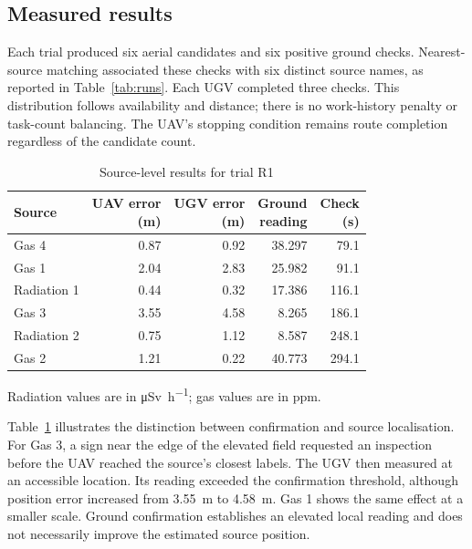 \documentclass[conference]{IEEEtran}
\begin{document}
\subsection{Measured results}
Each trial produced six aerial candidates and six positive ground checks. Nearest-source matching associated these checks with six distinct source names, as reported in Table~\ref{tab:runs}. Each UGV completed three checks. This distribution follows availability and distance; there is no work-history penalty or task-count balancing. The UAV's stopping condition remains route completion regardless of the candidate count.

\begin{table}[t]
\caption{Source-level results for trial R1}
\label{tab:sources}
\centering
\small
\begin{tabular}{@{}lrrrr@{}}
\toprule
Source & \shortstack{UAV error\\(m)} & \shortstack{UGV error\\(m)} & \shortstack{Ground\\reading} & \shortstack{Check\\(s)}\\
\midrule
Gas 4 & 0.87 & 0.92 & 38.297 & 79.1\\
Gas 1 & 2.04 & 2.83 & 25.982 & 91.1\\
Radiation 1 & 0.44 & 0.32 & 17.386 & 116.1\\
Gas 3 & 3.55 & 4.58 & 8.265 & 186.1\\
Radiation 2 & 0.75 & 1.12 & 8.587 & 248.1\\
Gas 2 & 1.21 & 0.22 & 40.773 & 294.1\\
\bottomrule
\end{tabular}
\par\smallskip
\footnotesize Radiation values are in \si{\micro\sievert\per\hour}; gas values are in ppm.
\end{table}

Table~\ref{tab:sources} illustrates the distinction between confirmation and source localisation. For Gas 3, a sign near the edge of the elevated field requested an inspection before the UAV reached the source's closest labels. The UGV then measured at an accessible location. Its reading exceeded the confirmation threshold, although position error increased from \SI{3.55}{\metre} to \SI{4.58}{\metre}. Gas 1 shows the same effect at a smaller scale. Ground confirmation establishes an elevated local reading and does not necessarily improve the estimated source position.
\end{document}
